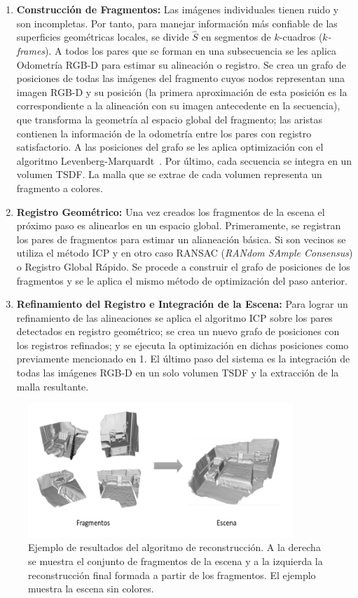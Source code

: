\begin{enumerate}
	\item \textbf{Construcción de Fragmentos:} Las imágenes individuales tienen ruido y son incompletas. Por tanto, para manejar información más confiable de las superficies geométricas locales, se divide $\hat{S}$ en segmentos de $k$-cuadros (\textit{$k$-frames}). A todos los pares que se forman en una subsecuencia se les aplica Odometría RGB-D para estimar su alineación o registro. Se crea un grafo de posiciones de todas las imágenes del fragmento cuyos nodos representan una imagen RGB-D  y su posición (la primera aproximación de esta posición es la correspondiente a la alineación con su imagen antecedente en la secuencia), que transforma la geometría al espacio global del fragmento; las aristas contienen la información de la odometría entre los pares con registro satisfactorio. A las posiciones del grafo se les aplica optimización con el algoritmo Levenberg-Marquardt~\cite{more1978levenberg}. Por último, cada secuencia se integra en un volumen TSDF. La malla que se extrae de cada volumen representa un fragmento a colores.
	
	\item \textbf{Registro Geométrico:} Una vez creados los fragmentos de la escena el próximo paso es alinearlos en un espacio global. Primeramente, se registran los pares de  fragmentos para estimar un alianeación básica. Si son vecinos se utiliza el método ICP y en otro caso RANSAC (\textit{RANdom SAmple Consensus}) o Registro Global Rápido. Se procede a construir el grafo de posiciones de los fragmentos y se le aplica el mismo método de optimización del paso anterior.
	
	\item \textbf{Refinamiento del Registro e Integración de la Escena:} Para lograr un refinamiento de las alineaciones se aplica el algoritmo ICP sobre los pares detectados en registro geométrico; se crea un nuevo grafo de posiciones con los registros refinados; y se ejecuta la optimización en dichas posiciones como previamente mencionado en 1. El último paso del sistema es la integración de todas las imágenes RGB-D en un solo volumen TSDF y la extracción de la malla resultante.
\end{enumerate}

\begin{figure}[ht]
	\centering
	\includegraphics[width=10cm]{./Graphics/algo3d.png}
	\caption{Ejemplo de resultados del algoritmo de reconstrucción. A la derecha se muestra el conjunto de fragmentos de la escena y a la izquierda la reconstrucción final formada a partir de los fragmentos. El ejemplo muestra la escena sin colores.}
\end{figure}

